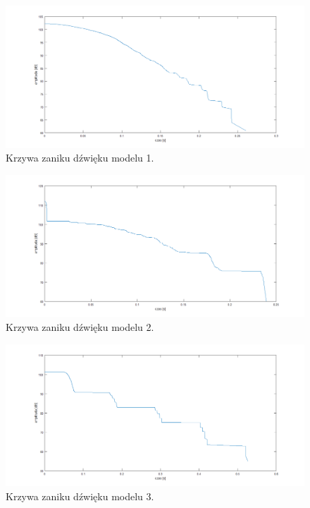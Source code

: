 \begin{figure}[h]
        \centering
                \centering
                \includegraphics[width=12cm]{zanik1}
	\caption{Krzywa zaniku dźwięku modelu 1.}
\end{figure}

\begin{figure}[h]
        \centering
                \centering
                \includegraphics[width=12cm]{zanik2}
	\caption{Krzywa zaniku dźwięku modelu 2.}
\end{figure}

\begin{figure}[h]
        \centering
                \centering
                \includegraphics[width=12cm]{zanik3}
	\caption{Krzywa zaniku dźwięku modelu 3.}
\end{figure}



